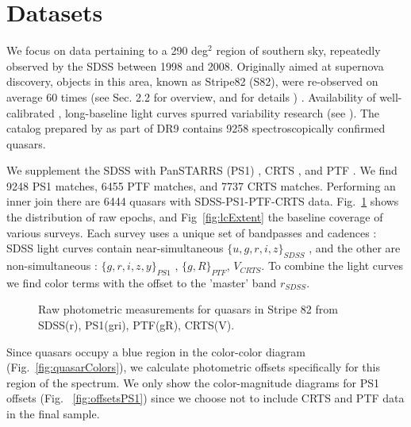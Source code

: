 \documentclass[twocolumn]{aastex62}
\begin{document}
\section{Datasets}

We focus on data pertaining to a 290 deg$^{2}$ region of southern sky, repeatedly observed by the SDSS between 1998 and 2008. Originally aimed at supernova discovery, objects in this area, known as Stripe82 (S82), were  re-observed on average 60 times (see \citealt{macleod2012} Sec. 2.2 for overview, and \citealt{annis2014} for details ) . Availability of well-calibrated \citep{ivezic2007}, long-baseline light curves spurred variability research (see \citealt{sesar2007}). The catalog prepared by \citep{schneider2008} as part of DR9  contains 9258 spectroscopically confirmed quasars.  

We supplement the SDSS with PanSTARRS (PS1) \citep{chambers2011,flewelling2018}, CRTS \citep{drake2009}, and PTF \citep{rau2009}. We find 9248 PS1 matches, 6455 PTF matches, and 7737 CRTS matches. Performing an inner join there are 6444 quasars with SDSS-PS1-PTF-CRTS data. Fig.~\ref{fig:rawBaselines}  shows the distribution of raw epochs, and Fig~\ref{fig:lcExtent} the  baseline coverage of various surveys.    Each survey uses a unique set of bandpasses and cadences : SDSS light curves contain near-simultaneous $\{u,g,r,i,z\}_{SDSS}$ , and the other are  non-simultaneous : $\{g,r,i,z,y\}_{PS1}$ ,  $\{g,R\}_{PTF}$, $V_{CRTS}$.  To combine the light curves we find color terms with the offset to the 'master' band  $r_{SDSS}$.

\begin{figure}%
\caption{Raw photometric measurements for quasars in Stripe 82 from SDSS(r),  PS1(gri),  PTF(gR), CRTS(V).}
\label{fig:rawBaselines}
\end{figure} 

\begin{figure*}
\caption{The contribution to quasars light curve baseline from surveys, including the planned LSST coverage. Vertical offset is arbitrary. Note how PS1 and PTF extend the baseline of SDSS by approximately $50\%$, and how inclusion of LSST triples the SDSS baseline. }
\label{fig:lcExtent}
\end{figure*} 

Since quasars occupy a blue region in the color-color diagram (Fig.~\ref{fig:quasarColors}), we calculate photometric offsets specifically for this region of the spectrum.  We only show the color-magnitude diagrams  for PS1 offsets  (Fig. ~\ref{fig:offsetsPS1}) since we choose not to include CRTS and PTF data in the final sample. 
\end{document}
